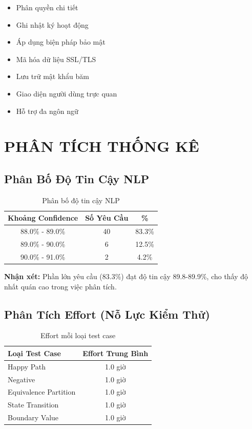 \documentclass[12pt, a4paper]{article}
\begin{document}
\begin{itemize}
    \item Phân quyền chi tiết
    \item Ghi nhật ký hoạt động
    \item Áp dụng biện pháp bảo mật
    \item Mã hóa dữ liệu SSL/TLS
    \item Lưu trữ mật khẩu băm
    \item Giao diện người dùng trực quan
    \item Hỗ trợ đa ngôn ngữ
\end{itemize}

\newpage

\section{PHÂN TÍCH THỐNG KÊ}

\subsection{Phân Bố Độ Tin Cậy NLP}

\begin{table}[h]
\centering
\begin{tabular}{|c|c|c|}
\hline
\textbf{Khoảng Confidence} & \textbf{Số Yêu Cầu} & \textbf{\%} \\
\hline
88.0\% - 89.0\% & 40 & 83.3\% \\
89.0\% - 90.0\% & 6 & 12.5\% \\
90.0\% - 91.0\% & 2 & 4.2\% \\
\hline
\end{tabular}
\caption{Phân bố độ tin cậy NLP}
\end{table}

\textbf{Nhận xét:}
Phần lớn yêu cầu (83.3\%) đạt độ tin cậy 89.8-89.9\%, cho thấy độ nhất quán cao trong việc phân tích.

\subsection{Phân Tích Effort (Nỗ Lực Kiểm Thử)}

\begin{table}[h]
\centering
\begin{tabular}{|l|c|}
\hline
\textbf{Loại Test Case} & \textbf{Effort Trung Bình} \\
\hline
Happy Path & 1.0 giờ \\
Negative & 1.0 giờ \\
Equivalence Partition & 1.0 giờ \\
State Transition & 1.0 giờ \\
Boundary Value & 1.0 giờ \\
\hline
\end{tabular}
\caption{Effort mỗi loại test case}
\end{table}
\end{document}
